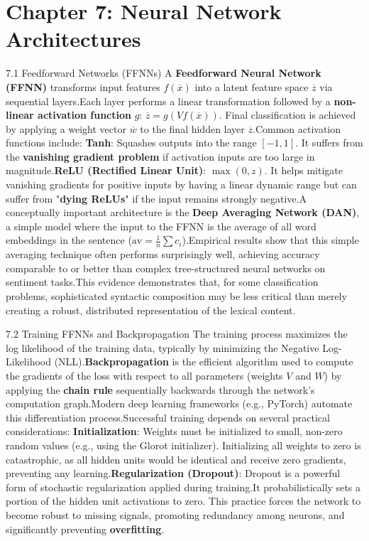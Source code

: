 \documentclass{article}
\begin{document}
\section{Chapter 7: Neural Network Architectures}
7.1 Feedforward Networks (FFNNs)
A \textbf{Feedforward Neural Network (FFNN)} transforms input features $f(\overline{x})$ into a latent feature space $\overline{z}$ via sequential layers.\footnotemark[1] Each layer performs a linear transformation followed by a \textbf{non-linear activation function} $g$: $\overline{z} = g(V f(\overline{x}))$. Final classification is achieved by applying a weight vector $\overline{w}$ to the final hidden layer $\overline{z}$.\footnotemark[1]
Common activation functions include:
\textbf{Tanh}: Squashes outputs into the range $[-1, 1]$. It suffers from the \textbf{vanishing gradient problem} if activation inputs are too large in magnitude.\footnotemark[1]
\textbf{ReLU (Rectified Linear Unit)}: $\max(0, z)$. It helps mitigate vanishing gradients for positive inputs by having a linear dynamic range but can suffer from "\textbf{dying ReLUs}" if the input remains strongly negative.\footnotemark[1]
A conceptually important architecture is the \textbf{Deep Averaging Network (DAN)}, a simple model where the input to the FFNN is the average of all word embeddings in the sentence ($\text{av} = \frac{1}{n} \sum c_i$).\footnotemark[1] Empirical results show that this simple averaging technique often performs surprisingly well, achieving accuracy comparable to or better than complex tree-structured neural networks on sentiment tasks.\footnotemark[1] This evidence demonstrates that, for some classification problems, sophisticated syntactic composition may be less critical than merely creating a robust, distributed representation of the lexical content.

7.2 Training FFNNs and Backpropagation
The training process maximizes the log likelihood of the training data, typically by minimizing the Negative Log-Likelihood (NLL).\footnotemark[1] \textbf{Backpropagation} is the efficient algorithm used to compute the gradients of the loss with respect to all parameters (weights $V$ and $W$) by applying the \textbf{chain rule} sequentially backwards through the network's computation graph.\footnotemark[1] Modern deep learning frameworks (e.g., PyTorch) automate this differentiation process.\footnotemark[1]
Successful training depends on several practical considerations:
\textbf{Initialization}: Weights must be initialized to small, non-zero random values (e.g., using the Glorot initializer). Initializing all weights to zero is catastrophic, as all hidden units would be identical and receive zero gradients, preventing any learning.\footnotemark[1]
\textbf{Regularization (Dropout)}: Dropout is a powerful form of stochastic regularization applied during training.\footnotemark[1] It probabilistically sets a portion of the hidden unit activations to zero. This practice forces the network to become robust to missing signals, promoting redundancy among neurons, and significantly preventing \textbf{overfitting}.\footnotemark[1]
\end{document}
